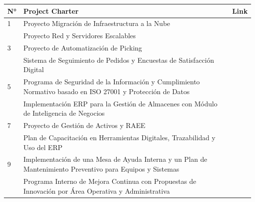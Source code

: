\documentclass[11pt, a4paper, oneside]{report}
\begin{document}
\begin{table}[H]
\centering
\renewcommand{\arraystretch}{1.35}
\setlength{\tabcolsep}{8pt}

\begin{tabularx}{\textwidth}{
    |>{\raggedright\arraybackslash}p{}
    |>{\raggedright\arraybackslash}p{}
    |>{\centering\arraybackslash}X|
}
\hline

\rowcolor{upeu_dark}
\centering\color{white}\bfseries N°
&
\centering\color{white}\bfseries Project Charter
&
\color{white}\bfseries Link
\\
\hline

\rowcolor{gray!10}
1
&
Proyecto Migración de Infraestructura a la Nube
&
 
\\
\hline
2
&
Proyecto Red y Servidores Escalables
&
\\
\hline

\rowcolor{gray!10}
3
&
Proyecto de Automatización de Picking
&
 
\\
\hline
4
&
Sistema de Seguimiento de Pedidos y Encuestas de Satisfacción Digital
&
 
\\
\hline
\rowcolor{gray!10}
5
&
Programa de Seguridad de la Información y Cumplimiento Normativo basado en ISO 27001 y Protección de Datos
&
 
\\
\hline
6
&
Implementación ERP para la Gestión de Almacenes con Módulo de Inteligencia de Negocios
&
 
\\
\hline
\rowcolor{gray!10}
7
&
Proyecto de Gestión de Activos y RAEE
&
 
\\
\hline
8
&
Plan de Capacitación en Herramientas Digitales, Trazabilidad y Uso del ERP
&
 
\\
\hline
\rowcolor{gray!10}
9
&
Implementación de una Mesa de Ayuda Interna y un Plan de Mantenimiento Preventivo para Equipos y Sistemas
&
 
\\
\hline
10
&
Programa Interno de Mejora Continua con Propuestas de Innovación por Área Operativa y Administrativa
&
 
\\
\hline

\end{tabularx}
\end{table}
\end{document}
